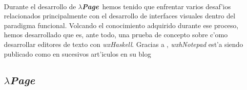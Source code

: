 \documentclass[a4paper]{article}
\newcommand{\hpage}{\textbf{\textsl{$\lambda$Page}}}
\begin{document}
\paragraph{}Durante el desarrollo de \hpage\ hemos tenido que enfrentar varios desaf'ios relacionados principalmente con el desarrollo de interfaces visuales dentro del paradigma funcional.  Volcando el conocimiento adquirido durante ese proceso, hemos desarrollado  que es, ante todo, una prueba de concepto sobre c'omo desarrollar editores de texto con \textsl{wxHaskell}.  Gracias a , \textsl{wxhNotepad} est'a siendo publicado como  en sucesivos art'iculos en su blog
\subsection{\hpage}
\end{document}
